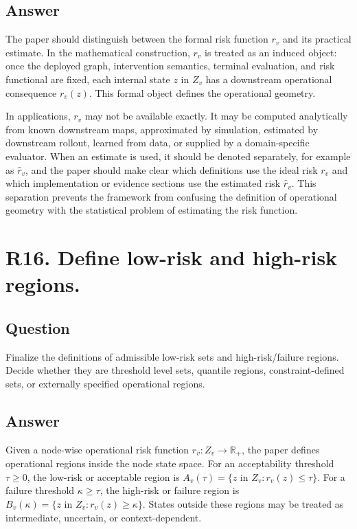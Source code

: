 \documentclass[11pt,a4paper]{article}
\begin{document}
\subsection*{Answer}

The paper should distinguish between the formal risk function \(r_v\) and its practical estimate. In the mathematical construction, \(r_v\) is treated as an induced object: once the deployed graph, intervention semantics, terminal evaluation, and risk functional are fixed, each internal state \(z\) in \(Z_v\) has a downstream operational consequence \(r_v(z)\). This formal object defines the operational geometry.

In applications, \(r_v\) may not be available exactly. It may be computed analytically from known downstream maps, approximated by simulation, estimated by downstream rollout, learned from data, or supplied by a domain-specific evaluator. When an estimate is used, it should be denoted separately, for example as \(\widehat{r}_v\), and the paper should make clear which definitions use the ideal risk \(r_v\) and which implementation or evidence sections use the estimated risk \(\widehat{r}_v\). This separation prevents the framework from confusing the definition of operational geometry with the statistical problem of estimating the risk function.

\section*{R16. Define low-risk and high-risk regions.}

\subsection*{Question}

Finalize the definitions of admissible low-risk sets and high-risk/failure regions. Decide whether they are threshold level sets, quantile regions, constraint-defined sets, or externally specified operational regions.

\subsection*{Answer}

Given a node-wise operational risk function \(r_v: Z_v \to \mathbb{R}_+\), the paper defines operational regions inside the node state space. For an acceptability threshold \(\tau \geq 0\), the low-risk or acceptable region is \(A_v(\tau) = \{z \text{ in } Z_v : r_v(z) \leq \tau\}\). For a failure threshold \(\kappa \geq \tau\), the high-risk or failure region is \(B_v(\kappa) = \{z \text{ in } Z_v : r_v(z) \geq \kappa\}\). States outside these regions may be treated as intermediate, uncertain, or context-dependent.
\end{document}

